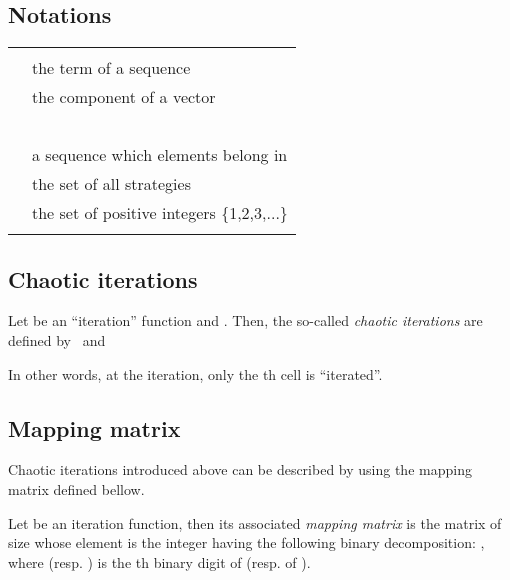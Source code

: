 \documentclass[conference]{IEEEtran}
\begin{document}
\subsection{Notations}
\begin{tabular}{@{}c@{}@{}l@{}}
 &  \\
 &  the  term of a sequence  \\
 &  the  component of a vector\\
&~~~~\\
 &  a sequence which elements belong in  \\
 &  the set of all strategies \\
 &  the set of positive integers \{1,2,3,...\} \\
 &    \\
\end{tabular}




\subsection{Chaotic iterations}
\label{subsection:Chaotic iterations}

\begin{definition}
Let  be an ``iteration'' function and . Then, the so-called \emph{chaotic iterations} are defined by~\cite{Robert1986}  and

\end{definition}
In other words, at the  iteration, only the th cell is
\textquotedblleft iterated\textquotedblright.



\subsection{Mapping matrix}

Chaotic iterations introduced above can be described by using the mapping matrix defined bellow.

\begin{definition}
Let 
be an iteration function, then its associated \emph{mapping matrix}
 is the matrix of size  whose element   is the integer having the following binary decomposition:  , where  (resp. ) is the th binary digit of  (resp. of ).
\end{definition}
\end{document}
